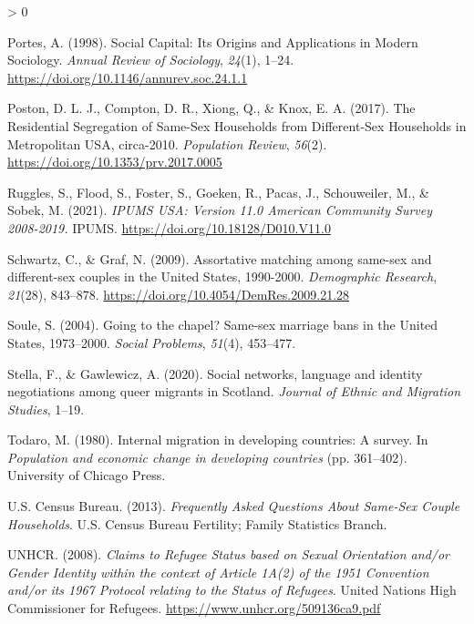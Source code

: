 \documentclass[
  11pt,
]{article}
\newlength{\cslhangindent}
\newenvironment{CSLReferences}[2] %
 {%
  \setlength{\parindent}{0pt}
  \ifodd #1 \everypar{\setlength{\hangindent}{\cslhangindent}}\ignorespaces\fi
  \ifnum #2 > 0
  \setlength{\parskip}{#2\baselineskip}
  \fi
 }%
 {}
\begin{document}
\begin{CSLReferences}{1}{0}
\leavevmode\hypertarget{ref-portes_1998}{}%
Portes, A. (1998). Social {Capital}: {Its} {Origins} and {Applications} in {Modern} {Sociology}. \emph{Annual Review of Sociology}, \emph{24}(1), 1--24. \url{https://doi.org/10.1146/annurev.soc.24.1.1}

\leavevmode\hypertarget{ref-poston_2017}{}%
Poston, D. L. J., Compton, D. R., Xiong, Q., \& Knox, E. A. (2017). The {Residential} {Segregation} of {Same}-{Sex} {Households} from {Different}-{Sex} {Households} in {Metropolitan} {USA}, circa-2010. \emph{Population Review}, \emph{56}(2). \url{https://doi.org/10.1353/prv.2017.0005}

\leavevmode\hypertarget{ref-ruggles_2021}{}%
Ruggles, S., Flood, S., Foster, S., Goeken, R., Pacas, J., Schouweiler, M., \& Sobek, M. (2021). \emph{{IPUMS} {USA}: {Version} 11.0 {American} {Community} {Survey} 2008-2019.} IPUMS. \url{https://doi.org/10.18128/D010.V11.0}

\leavevmode\hypertarget{ref-schwartz_2009}{}%
Schwartz, C., \& Graf, N. (2009). Assortative matching among same-sex and different-sex couples in the {United} {States}, 1990-2000. \emph{Demographic Research}, \emph{21}(28), 843--878. \url{https://doi.org/10.4054/DemRes.2009.21.28}

\leavevmode\hypertarget{ref-soule_2004}{}%
Soule, S. (2004). Going to the chapel? {Same}-sex marriage bans in the {United} {States}, 1973--2000. \emph{Social Problems}, \emph{51}(4), 453--477.

\leavevmode\hypertarget{ref-stella_2020}{}%
Stella, F., \& Gawlewicz, A. (2020). Social networks, language and identity negotiations among queer migrants in {Scotland}. \emph{Journal of Ethnic and Migration Studies}, 1--19.

\leavevmode\hypertarget{ref-todaro_1980}{}%
Todaro, M. (1980). Internal migration in developing countries: A survey. In \emph{Population and economic change in developing countries} (pp. 361--402). University of Chicago Press.

\leavevmode\hypertarget{ref-u.s.censusbureau_2013}{}%
U.S. Census Bureau. (2013). \emph{Frequently {Asked} {Questions} {About} {Same}-{Sex} {Couple} {Households}}. U.S. Census Bureau Fertility; Family Statistics Branch.

\leavevmode\hypertarget{ref-unhcr_2008}{}%
UNHCR. (2008). \emph{Claims to {Refugee} {Status} based on {Sexual} {Orientation} and/or {Gender} {Identity} within the context of {Article} {1A}(2) of the 1951 {Convention} and/or its 1967 {Protocol} relating to the {Status} of {Refugees}}. United Nations High Commissioner for Refugees. \url{https://www.unhcr.org/509136ca9.pdf}


\end{CSLReferences}
\end{document}
